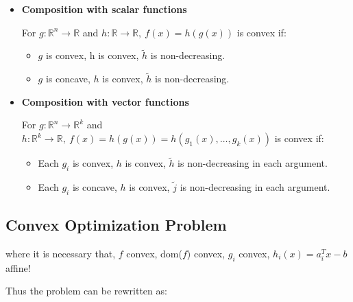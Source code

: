 \documentclass[8pt,a4paper]{scrartcl}
\begin{document}
\begin{multicols*}{3}
\begin{multicols*}{4}
{\begin{itemize}
If $f(x,y)$ is convex in $(x,y)$ and the set $\mathcal{C}$ is convex, then 


is convex
\item \textbf{Composition with scalar functions}

For $g:\mathbb{R}^n\rightarrow\mathbb{R}$ and $h:\mathbb{R}\rightarrow\mathbb{R},\ f(x)=h(g(x))$ is convex if:

\begin{itemize}

\item $g$ is convex, h is convex, $\tilde{h}$ is non-decreasing.
\item $g$ is concave, $h$ is convex, $\tilde{h}$ is non-decreasing.
\end{itemize}

\item \textbf{Composition with vector functions}

For $g:\mathbb{R}^n\rightarrow\mathbb{R}^k$ and $h:\mathbb{R}^k\rightarrow \mathbb{R},\ f(x)=h(g(x))=h(g_1(x),\ldots,g_k(x))$ is convex if:

\begin{itemize}

\item Each $g_i$ is convex, $h$ is convex, $\tilde{h}$ is non-decreasing in each argument.
\item Each $g_i$ is concave, $h$ is convex, $\tilde{j}$ is non-decreasing in each argument.
\end{itemize}
\end{itemize}
}%

\subsection{Convex Optimization Problem}


where it is necessary that, $f$ convex, dom($f$) convex, $g_i$ convex, $h_i(x)=a_i^Tx-b$ affine!

\finn

Thus the problem can be rewritten as:



\end{multicols*}
\end{multicols*}
\end{document}
